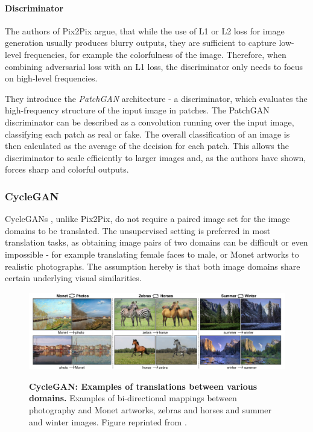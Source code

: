 \documentclass{article}
\begin{document}
\paragraph{Discriminator} \label{sec:patchgan}
The authors of Pix2Pix \cite{isola_image--image_2016} argue, that while the use of L1 or L2 loss for image generation usually produces blurry outputs, they are sufficient to capture low-level frequencies, for example the colorfulness of the image. Therefore, when combining adversarial loss with an L1 loss, the discriminator only needs to focus on high-level frequencies. 

They introduce the \textit{PatchGAN} architecture - a discriminator, which evaluates the high-frequency structure of the input image in patches. The PatchGAN discriminator can be described as a convolution running over the input image, classifying each patch as real or fake. The overall classification of an image is then calculated as the average of the decision for each patch. This allows the discriminator to scale efficiently to larger images and, as the authors have shown, forces sharp and colorful outputs.



\pagebreak
\subsubsection{CycleGAN}
CycleGANs \cite{zhu_unpaired_2017}, unlike Pix2Pix, do not require a paired image set for the image domains to be translated. The unsupervised setting is preferred in most translation tasks, as obtaining image pairs of two domains can be difficult or even impossible - for example translating female faces to male, or Monet artworks to realistic photographs. The assumption hereby is that both image domains share certain underlying visual similarities.

\begin{figure}[h]
\centering
{\includegraphics[width=\linewidth]{GAN/cyclegan_example}}
\caption{\label{fig:cyclegan_examples} \textbf{CycleGAN: Examples of translations between various domains.} Examples of bi-directional mappings between photography and Monet artworks, zebras and horses and summer and winter images. Figure reprinted from \cite{zhu_unpaired_2017}.}
\end{figure}
\end{document}
